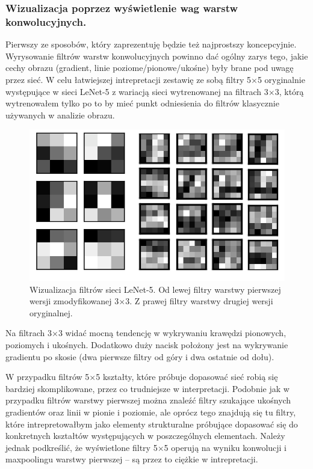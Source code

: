 \subsubsection{Wizualizacja poprzez wyświetlenie wag warstw konwolucyjnych.}
Pierwszy ze sposobów, który zaprezentuję będzie też najprostszy koncepcyjnie. Wyrysowanie filtrów warstw konwolucyjnych powinno dać ogólny zarys tego, jakie cechy obrazu (gradient, linie poziome/pionowe/ukośne) były brane pod uwagę przez sieć. W celu łatwiejszej intrepretacji zestawię ze sobą filtry 5\(\times\)5 oryginalnie występujące w sieci LeNet-5 z wariacją sieci wytrenowanej na filtrach 3\(\times\)3, którą wytrenowałem tylko po to by mieć punkt odniesienia do filtrów
klasycznie używanych w analizie obrazu.

\begin{figure}[ht]
\centerline{\includegraphics[scale=0.5]{resources/plot_filtry.png}}
\caption{Wizualizacja filtrów sieci LeNet-5. Od lewej filtry warstwy pierwszej wersji zmodyfikowanej 3\(\times\)3. Z prawej filtry warstwy drugiej wersji oryginalnej.}
\label{fig:lenet5-response}
\end{figure}

Na filtrach 3\(\times\)3 widać mocną tendencję w wykrywaniu krawędzi pionowych, poziomych i ukośnych. Dodatkowo duży nacisk położony jest na wykrywanie gradientu po skosie (dwa pierwsze filtry od góry i dwa ostatnie od dołu).

W przypadku filtrów 5\(\times\)5 kształty, które próbuje dopasować sieć robią się bardziej skomplikowane, przez co trudniejsze w interpretacji. Podobnie jak w przypadku filtrów warstwy pierwszej można znaleźć filtry szukające ukośnych gradientów oraz linii w pionie i poziomie, ale oprócz tego znajdują się tu filtry, które intrepretowałbym jako elementy strukturalne próbujące dopasować się do konkretnych kształtów występujących w poszczególnych elementach. Należy jednak podkreślić, że
wyświetlone filtry 5\(\times\)5 operują na wyniku konwolucji i maxpoolingu warstwy pierwszej -- są przez to ciężkie w intrepretacji.

